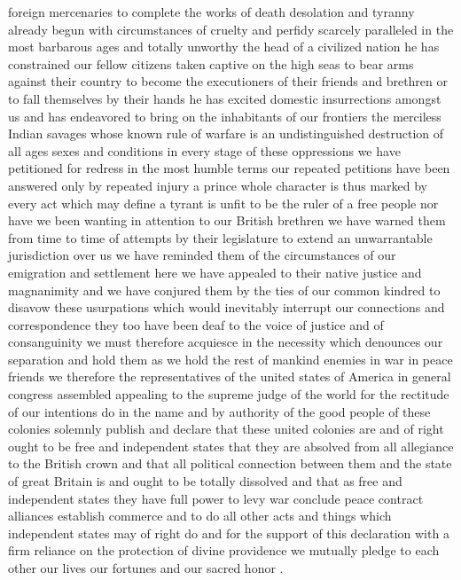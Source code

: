 foreign mercenaries to complete the works of death desolation and
tyranny already begun with circumstances of cruelty and perfidy scarcely
paralleled in the most barbarous ages and totally unworthy the head of a
civilized nation he has constrained our fellow citizens taken captive on
the high seas to bear arms against their country to become the
executioners of their friends and brethren or to fall themselves by
their hands he has excited domestic insurrections amongst us and has
endeavored to bring on the inhabitants of our frontiers the merciless
Indian savages whose known rule of warfare is an undistinguished
destruction of all ages sexes and conditions in every stage of these
oppressions we have petitioned for redress in the most humble terms our
repeated petitions have been answered only by repeated injury a prince
whole character is thus marked by every act which may define a tyrant is
unfit to be the ruler of a free people nor have we been wanting in
attention to our British brethren we have warned them from time to time
of attempts by their legislature to extend an unwarrantable jurisdiction
over us we have reminded them of the circumstances of our emigration and
settlement here we have appealed to their native justice and magnanimity
and we have conjured them by the ties of our common kindred to disavow
these usurpations which would inevitably interrupt our connections and
correspondence they too have been deaf to the voice of justice and of
consanguinity we must therefore acquiesce in the necessity which
denounces our separation and hold them as we hold the rest of mankind
enemies in war in peace friends we therefore the representatives of the
united states of America in general congress assembled appealing to the
supreme judge of the world for the rectitude of our intentions do in the
name and by authority of the good people of these colonies solemnly
publish and declare that these united colonies are and of right ought to
be free and independent states that they are absolved from all
allegiance to the British crown and that all political connection
between them and the state of great Britain is and ought to be totally
dissolved and that as free and independent states they have full power
to levy war conclude peace contract alliances establish commerce and to
do all other acts and things which independent states may of right do
and for the support of this declaration with a firm reliance on the
protection of divine providence we mutually pledge to each other our
lives our fortunes and our sacred honor .

